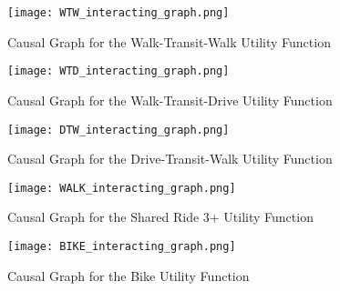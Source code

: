 \begin{figure}
   \centering
   \texttt{[image: WTW\_interacting\_graph.png]}
   \caption{Causal Graph for the Walk-Transit-Walk Utility Function}
   \label{fig:WTW_causal_2}
\end{figure}

\begin{figure}
   \centering
   \texttt{[image: WTD\_interacting\_graph.png]}
   \caption{Causal Graph for the Walk-Transit-Drive Utility Function}
   \label{fig:WTD_causal_2}
\end{figure}

\begin{figure}
   \centering
   \texttt{[image: DTW\_interacting\_graph.png]}
   \caption{Causal Graph for the Drive-Transit-Walk Utility Function}
   \label{fig:DTW_causal_2}
\end{figure}

\begin{figure}
   \centering
   \texttt{[image: WALK\_interacting\_graph.png]}
   \caption{Causal Graph for the Shared Ride 3+ Utility Function}
   \label{fig:WALK_causal_2}
\end{figure}

\begin{figure}
   \centering
   \texttt{[image: BIKE\_interacting\_graph.png]}
   \caption{Causal Graph for the Bike Utility Function}
   \label{fig:BIKE_causal_2}
\end{figure}

